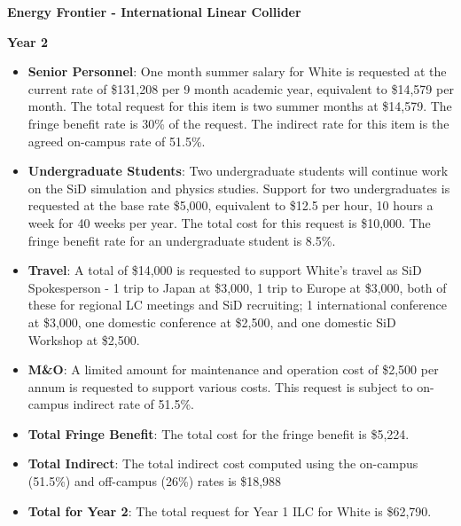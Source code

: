 \textbf{Energy Frontier - International Linear Collider}

\textbf{Year 2}

\begin{itemize}

\item{{\bf Senior Personnel}: One month summer salary for White is requested at the current rate of \$131,208 per 9 month academic year, 
equivalent to \$14,579 per month.  The total request for this item is two summer months at \$14,579. The fringe benefit rate is 30\% of the request.  
The indirect rate for this item is the agreed on-campus rate of 51.5\%.}

\item {{\bf Undergraduate Students}: Two undergraduate students will continue work on the SiD simulation and physics studies.
Support for two undergraduates is requested at the base rate \$5,000, equivalent to \$12.5 per hour, 10 hours a week for 40 weeks per year.  
The total cost for this request is \$10,000.  The fringe benefit rate for an undergraduate student is 8.5\%.}

\item{{\bf Travel}: A total of \$14,000 is requested to support White's travel as SiD Spokesperson - 1 trip to Japan at \$3,000, 1 trip to
Europe at \$3,000, both of these for regional LC meetings and SiD recruiting; 1 international conference at \$3,000, one domestic conference 
at \$2,500, and one domestic SiD Workshop at \$2,500.}

\item {{\bf M\&O}: A limited amount for maintenance and operation cost of \$2,500 per annum is requested to support various costs.   
This request is subject to on-campus indirect rate of 51.5\%.}

\item {{\bf Total Fringe Benefit}: The total cost for the fringe benefit is \$5,224.}

\item {{\bf Total Indirect}: The total indirect cost computed using the on-campus (51.5\%) and off-campus (26\%) rates is \$18,988}

\item {{\bf Total for Year 2}: The total request for Year 1 ILC for White is \$62,790.}

\end{itemize}